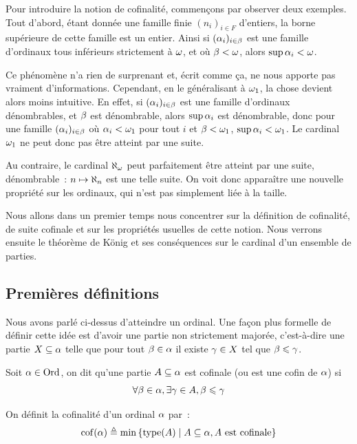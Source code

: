 Pour introduire la notion de cofinalité, commençons par observer deux exemples.
Tout d'abord, étant donnée une famille finie $(n_i)_{i\in F}$ d'entiers, la borne
supérieure de cette famille est un entier. Ainsi si $(\alpha_i)_{i\in \beta}$ est
une famille d'ordinaux tous inférieurs strictement à $\omega$, et où
$\beta < \omega$, alors $\sup \alpha_i < \omega$.

Ce phénomène n'a rien de surprenant et, écrit comme ça, ne nous apporte pas
vraiment d'informations. Cependant, en le généralisant à $\omega_1$, la chose
devient alors moins intuitive. En effet, si $(\alpha_i)_{i\in \beta}$ est une
famille d'ordinaux dénombrables, et $\beta$ est dénombrable, alors
$\sup \alpha_i$ est dénombrable, donc pour une famille
$(\alpha_i)_{i\in \beta}$ où $\alpha_i < \omega_1$ pour tout $i$ et
$\beta < \omega_1$, $\sup \alpha_i < \omega_1$. Le cardinal $\omega_1$ ne peut donc pas
être atteint par une suite.

Au contraire, le cardinal $\aleph_\omega$ peut parfaitement être atteint par
une suite, dénombrable~: $n \mapsto \aleph_n$ est une telle suite. On voit donc
apparaître une nouvelle propriété sur les ordinaux, qui n'est pas simplement
liée à la taille.

Nous allons dans un premier temps nous concentrer sur la définition de
cofinalité, de suite cofinale et sur les propriétés usuelles de cette notion.
Nous verrons ensuite le théorème de König et ses conséquences sur le cardinal
d'un ensemble de parties.

\subsection{Premières définitions}

Nous avons parlé ci-dessus d'atteindre un ordinal. Une façon plus formelle de
définir cette idée est d'avoir une partie non strictement majorée, c'est-à-dire
une partie $X\subseteq \alpha$ telle que pour tout $\beta \in \alpha$ il existe
$\gamma \in X$ tel que $\beta \leqslant \gamma$.

\begin{definition}[Cofinalité]
  Soit $\alpha\in\operatorname{Ord}$, on dit qu'une partie $A\subseteq \alpha$ est
  cofinale (ou est une cofin de $\alpha$) si
  \[\forall \beta \in \alpha, \exists \gamma \in A, \beta \leqslant \gamma\]

  On définit la cofinalité d'un ordinal $\alpha$ par~:
  \[\operatorname{cof}(\alpha) \triangleq
  \min \left\{ \operatorname{type}(A) \;\middle\vert\; A\subseteq\alpha,A\text{ est cofinale} \right\}\]
\end{definition}

